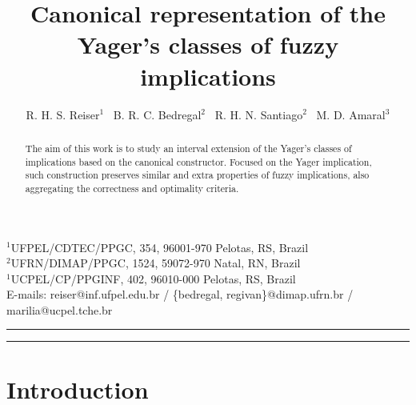 \documentclass[12pt]{article}
\title{Canonical representation of the Yager's classes of fuzzy implications}
\author{\scriptsize R. H. S. Reiser$^{1}$ \  B. R. C. Bedregal$^{2}$ \ R. H. N. Santiago$^{2}$ \ M. D. Amaral$^{3}$
}
\date{}
\theoremstyle{plain}
\theoremstyle{remark}
\theoremstyle{definition}
\theoremstyle{proposition}
\begin{document}
\maketitle

\vspace{-20pt}
\begin{center}
{\footnotesize $^1$UFPEL/CDTEC/PPGC, 354, 96001-970 Pelotas, RS, Brazil \\
$^2$UFRN/DIMAP/PPGC, 1524, 59072-970 Natal, RN, Brazil \\
$^1$UCPEL/CP/PPGINF, 402, 96010-000  Pelotas, RS, Brazil \\
E-mails: reiser@inf.ufpel.edu.br / \{bedregal, regivan\}@dimap.ufrn.br  / marilia@ucpel.tche.br
}\end{center}

\hrule

\begin{abstract}
The aim of this work is to study an interval extension of the Yager's classes of implications based on the canonical constructor. Focused on the Yager implication, such construction preserves similar and extra properties of fuzzy implications, also aggregating the correctness and optimality criteria.

\end{abstract}

\medskip
\noindent
{}

\medskip
\noindent
{}
\medskip

\hrule

\section{Introduction}\label{sec:1}
\end{document}
